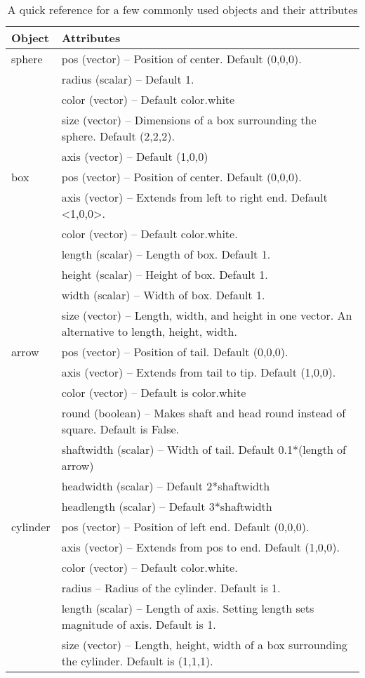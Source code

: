 \begin{table}
\centering
\caption[]{A quick reference for a few commonly used objects and their attributes}
\label{app:visualpython:objsattrs}
\begin{tabular}{p{}p{}}
\toprule
Object & Attributes \\
\hline
sphere & pos (vector) -- Position of center. Default (0,0,0). \\
 & radius (scalar) -- Default 1. \\
 & color (vector) -- Default color.white \\
 & size (vector) -- Dimensions of a box surrounding the sphere. Default (2,2,2). \\
 & axis (vector) -- Default (1,0,0) \\
box & pos (vector) -- Position of center. Default (0,0,0). \\
 & axis (vector) -- Extends from left to right end. Default \textless 1,0,0\textgreater . \\
 & color (vector) -- Default color.white. \\
 & length (scalar) -- Length of box. Default 1. \\
 & height (scalar) -- Height of box. Default 1. \\
 & width (scalar) -- Width of box. Default 1. \\
 & size (vector) -- Length, width, and height in one vector. An alternative to length, height, width. \\
arrow & pos (vector) -- Position of tail. Default (0,0,0). \\
 & axis (vector) -- Extends from tail to tip. Default (1,0,0). \\
 & color (vector) -- Default is color.white \\
 & round (boolean) -- Makes shaft and head round instead of square. Default is False. \\
 & shaftwidth (scalar) -- Width of tail. Default 0.1*(length of arrow) \\
 & headwidth (scalar) -- Default 2*shaftwidth \\
 & headlength (scalar) -- Default 3*shaftwidth \\
cylinder & pos (vector) -- Position of left end. Default (0,0,0). \\
 & axis (vector) -- Extends from pos to end. Default (1,0,0). \\
 & color (vector) -- Default color.white. \\
 & radius -- Radius of the cylinder. Default is 1. \\
 & length (scalar) -- Length of axis. Setting length sets magnitude of axis. Default is 1. \\
 & size (vector) -- Length, height, width of a box surrounding the cylinder. Default is (1,1,1). \\
\bottomrule
\end{tabular}
\end{table}

